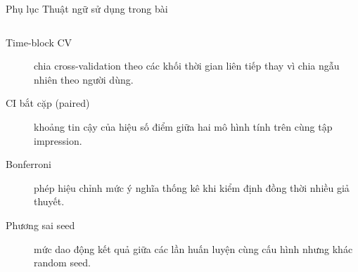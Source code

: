 \documentclass[aspectratio=169,t]{beamer}
\begin{document}
\begin{frame}[shrink]{Phụ lục \textperiodcentered{} Thuật ngữ sử dụng trong bài}
\begin{columns}[T,onlytextwidth]
\begin{description}
  \item[Time-block CV] chia cross-validation theo các khối thời gian liên tiếp thay vì chia ngẫu nhiên theo người dùng.
  \item[CI bắt cặp (paired)] khoảng tin cậy của hiệu số điểm giữa hai mô hình tính trên cùng tập impression.
  \item[Bonferroni] phép hiệu chỉnh mức ý nghĩa thống kê khi kiểm định đồng thời nhiều giả thuyết.
  \item[Phương sai seed] mức dao động kết quả giữa các lần huấn luyện cùng cấu hình nhưng khác random seed.
\end{description}
\end{columns}
\par\kern0pt%
\end{frame}
\end{document}
